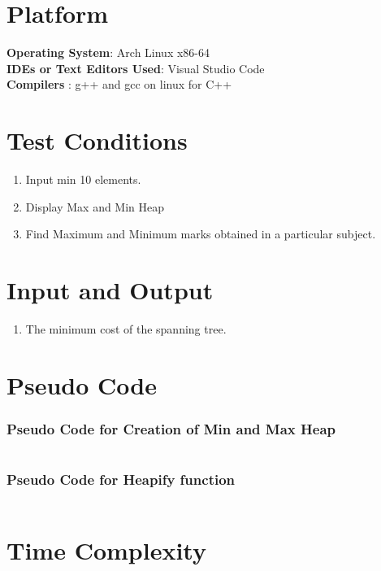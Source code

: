 \documentclass[11pt]{article}
\begin{document}
\section{Platform}
\textbf{\textbf{Operating System}}: Arch Linux x86-64 \\
\textbf{\textbf{IDEs or Text Editors Used}}: Visual Studio Code\\
\textbf{\textbf{Compilers} }: g++ and gcc on linux for C++\\

\section{Test Conditions}
\begin{enumerate}
    \item Input min 10 elements.
    \item Display Max and Min Heap
    \item Find Maximum and Minimum marks obtained in a particular subject.
\end{enumerate}

\section{Input and Output}
\begin{enumerate}
    \item The minimum cost of the spanning tree.
\end{enumerate}

\section{Pseudo Code}
\subsubsection*{Pseudo Code for Creation of Min and Max Heap}
\begin{lstlisting}[language=c++]

\end{lstlisting}
\subsubsection*{Pseudo Code for Heapify function}
\begin{lstlisting}[language=c++]

\end{lstlisting}


\section{Time Complexity}
\end{document}
